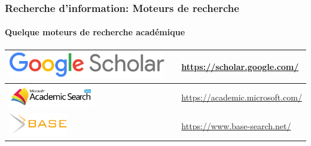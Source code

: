 \documentclass[xcolor=table]{beamer}
\begin{document}
\begin{frame}
\frametitle{Recherche d'information: Moteurs de recherche}
\framesubtitle{Quelque moteurs de recherche académique}

%	
%	

\def\arraystretch{0}
\begin{tabular}{L{.3\textwidth}{1cm}cp{.6\textwidth}}%
	
	\hline
	
	\includegraphics[height=.6cm]{..//img/Bweb02-ri-gmail/gscholar-logo.png} &
	&
	\url{https://scholar.google.com/} \\
	
	\hline
	
	\includegraphics[height=1cm]{..//img/Bweb02-ri-gmail/msacademic-logo.png} &
	& 
	\url{https://academic.microsoft.com/}  \\
	
	\hline
	
	\includegraphics[height=1cm]{..//img/Bweb02-ri-gmail/base-logo.png} &
	& 
	\url{https://www.base-search.net/} \\
	
	\hline
	

\end{tabular}
\end{frame}
\end{document}
